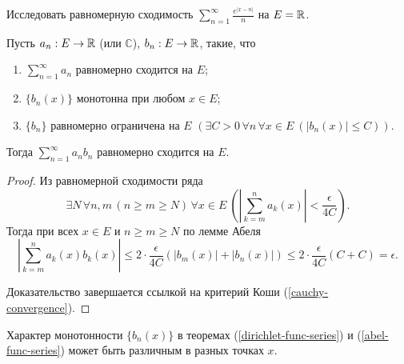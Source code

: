 
\begin{problem}
    Исследовать равномерную сходимость $\sum_{n = 1}^\infty \frac{e^{|x - n|}}{n}$ на $E = \mathbb{R}$.
\end{problem}

\begin{theorem}
    \label{abel-func-series}
    Пусть $a_n : E \rightarrow \mathbb{R}$ (или $\mathbb{C}$), $b_n : E \rightarrow \mathbb{R}$, такие, что
    \begin{enumerate}
        \item $\sum_{n = 1}^\infty a_n$ равномерно сходится на $E$;
        \item $\{b_n(x)\}$ монотонна при любом $x \in E$;
        \item $\{b_n\}$ равномерно ограничена на $E$ $(\exists C > 0 \, \forall n \, \forall x \in E \ \left(|b_n(x)| \le C\right))$.
    \end{enumerate}

    Тогда $\sum_{n = 1}^\infty a_n b_n$ равномерно сходится на $E$.

    \begin{proof}
        Из равномерной сходимости ряда 
        \[\exists N \, \forall n, m \, (n \ge m \ge N) \, \forall x \in E \ \left(\left|\sum_{k = m}^n a_k(x)\right| < \frac{\epsilon}{4C}\right).\]
        Тогда при всех $x \in E$ и $n \ge m \ge N$ по лемме Абеля
        \[
            \left|\sum_{k = m}^n a_k(x) b_k(x)\right| \le 2 \cdot \frac{\epsilon}{4C} \left(|b_m(x)| + |b_n(x)|\right) \le 2 \cdot \frac{\epsilon}{4C}(C + C) = \epsilon.
        \]

        Доказательство завершается ссылкой на критерий Коши (\ref{cauchy-convergence}).
    \end{proof}
\end{theorem}

\begin{note}
    Характер монотонности $\{b_n(x)\}$ в теоремах (\ref{dirichlet-func-series}) и (\ref{abel-func-series}) может быть различным в разных точках $x$.
\end{note}

